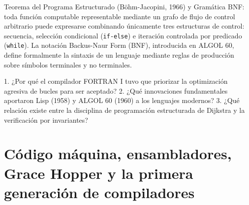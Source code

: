 \documentclass{book}
\begin{document}
\begin{tcolorbox}[title={Definición}, studiumdef, breakable]

Teorema del Programa Estructurado (Böhm-Jacopini, 1966) y Gramática BNF: toda función computable representable mediante un grafo de flujo de control arbitrario puede expresarse combinando únicamente tres estructuras de control: secuencia, selección condicional (\texttt{if-else}) e iteración controlada por predicado (\texttt{while}). La notación Backus-Naur Form (BNF), introducida en ALGOL 60, define formalmente la sintaxis de un lenguaje mediante reglas de producción sobre símbolos terminales y no terminales.
\end{tcolorbox}

\begin{tcolorbox}[title={Autoficha}, studiumcheck, breakable]

1. ¿Por qué el compilador FORTRAN I tuvo que priorizar la optimización agresiva de bucles para ser aceptado? 2. ¿Qué innovaciones fundamentales aportaron Lisp (1958) y ALGOL 60 (1960) a los lenguajes modernos? 3. ¿Qué relación existe entre la disciplina de programación estructurada de Dijkstra y la verificación por invariantes?
\end{tcolorbox}

\section{Código máquina, ensambladores, Grace Hopper y la primera generación de compiladores}
\end{document}
